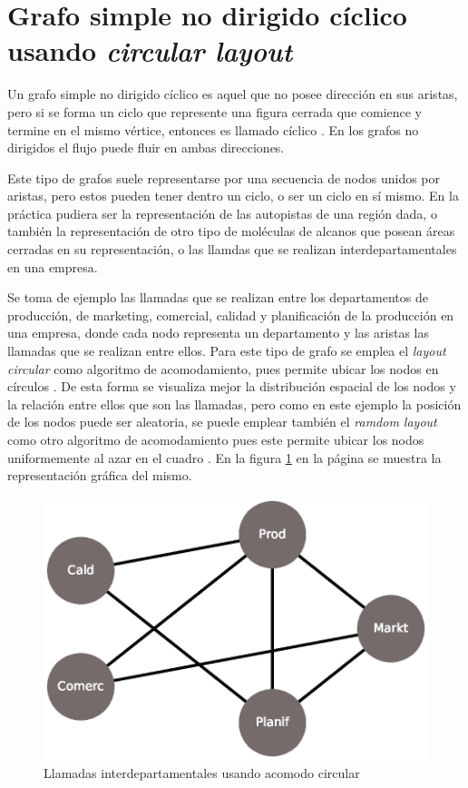 \documentclass{article}
\begin{document}
\section{Grafo simple no dirigido cíclico usando \textit{circular layout}}

Un grafo simple no dirigido cíclico es aquel que no posee dirección en sus aristas, pero si se forma un ciclo que represente una figura cerrada que comience y termine en el mismo vértice, entonces es llamado cíclico \cite{redes}. En los grafos no dirigidos el flujo puede fluir en ambas direcciones.

Este tipo de grafos suele representarse por una secuencia de nodos unidos por aristas, pero estos pueden tener dentro un ciclo, o ser un ciclo en sí mismo. En la práctica pudiera ser la representación de las autopistas de una región dada, o también la representación de otro tipo de moléculas de alcanos que posean áreas cerradas en su representación, o las llamdas que se realizan interdepartamentales en una empresa.

Se toma de ejemplo las llamadas que se realizan entre los departamentos de producción, de marketing, comercial, calidad y planificación de la producción en una empresa, donde cada nodo representa un departamento y las aristas las llamadas que se realizan entre ellos. Para este tipo de grafo se emplea el \textit{layout circular} como algoritmo de acomodamiento, pues permite ubicar los nodos en círculos \cite{layout}. De esta forma se visualiza mejor la distribución espacial de los nodos y la relación entre ellos que son las llamadas, pero como en este ejemplo la posición de los nodos puede ser aleatoria, se puede emplear también el \textit{ramdom layout} como otro algoritmo de acomodamiento pues este permite ubicar los nodos uniformemente al azar en el cuadro \cite{layout}. En la figura \ref{fig:Fig02} en la página \pageref{fig:Fig02} se muestra la representación gráfica del mismo.

\newpage


\begin{figure}[htbp]
    \centering
    \includegraphics[scale=0.4]{imagenes1/Fig02.eps}
    \caption{Llamadas interdepartamentales usando acomodo circular}
    \label{fig:Fig02}
\end{figure}
\end{document}
